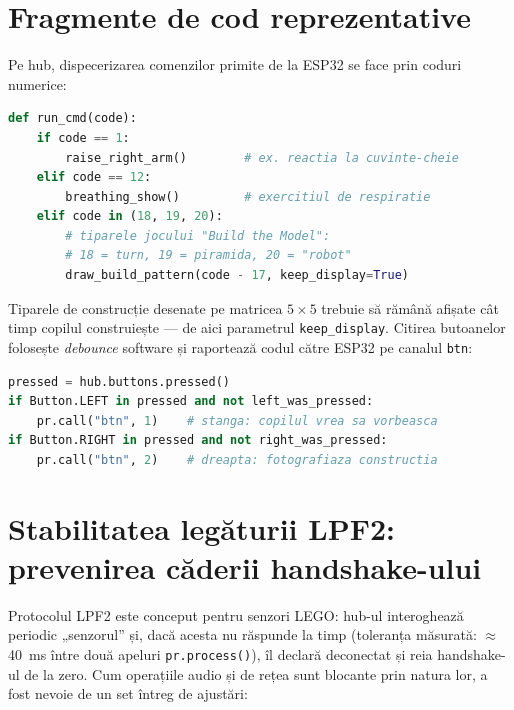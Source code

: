 \section{Fragmente de cod reprezentative}

Pe hub, dispecerizarea comenzilor primite de la ESP32 se face prin coduri numerice:

\begin{lstlisting}[language=Python, caption={Dispecerizarea comenzilor pe hub (fragment simplificat).}, label={lst:runcmd}]
def run_cmd(code):
    if code == 1:
        raise_right_arm()        # ex. reactia la cuvinte-cheie
    elif code == 12:
        breathing_show()         # exercitiul de respiratie
    elif code in (18, 19, 20):
        # tiparele jocului "Build the Model":
        # 18 = turn, 19 = piramida, 20 = "robot"
        draw_build_pattern(code - 17, keep_display=True)
\end{lstlisting}

Tiparele de construcție desenate pe matricea $5\times5$ trebuie să rămână afișate cât timp copilul construiește — de aici parametrul \texttt{keep\_display}. Citirea butoanelor folosește \emph{debounce} software și raportează codul către ESP32 pe canalul \texttt{btn}:

\begin{lstlisting}[language=Python, caption={Raportarea butoanelor către ESP32 (fragment).}, label={lst:btn}]
pressed = hub.buttons.pressed()
if Button.LEFT in pressed and not left_was_pressed:
    pr.call("btn", 1)    # stanga: copilul vrea sa vorbeasca
if Button.RIGHT in pressed and not right_was_pressed:
    pr.call("btn", 2)    # dreapta: fotografiaza constructia
\end{lstlisting}

\section{Stabilitatea legăturii LPF2: prevenirea căderii handshake-ului}
\label{sec:lpf2-stabilitate}

Protocolul LPF2 este conceput pentru senzori LEGO: hub-ul interoghează periodic „senzorul” și, dacă acesta nu răspunde la timp (toleranța măsurată: $\approx$40~ms între două apeluri \texttt{pr.process()}), îl declară deconectat și reia handshake-ul de la zero. Cum operațiile audio și de rețea sunt blocante prin natura lor, a fost nevoie de un set întreg de ajustări:

